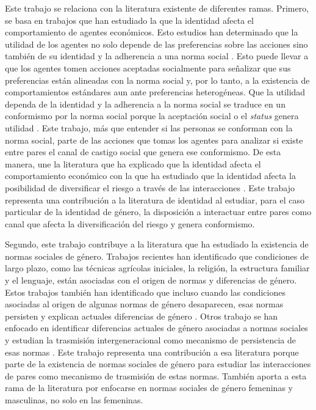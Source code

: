 Este trabajo se relaciona con la literatura existente de diferentes ramas. Primero, se basa en trabajos que han estudiado la que la identidad afecta el comportamiento de agentes económicos. Esto estudios han determinado  que la utilidad de los agentes no solo depende de las preferencias sobre las acciones sino también de su identidad y la adherencia a una norma social \citep{akerlof2000economics}. Esto puede llevar a que los agentes tomen acciones aceptadas socialmente para señalizar que sus preferencias están alineadas con la norma social y, por lo tanto, a la existencia de comportamientos estándares aun ante preferencias heterogéneas. Que la utilidad dependa de la identidad y la adherencia a la norma social se traduce en un conformismo por la norma social porque la aceptación social o el \textit{status} genera utilidad \citep{bernheim1994theory}. Este trabajo, más que entender si las personas se conforman con la norma social, parte de las acciones que tomas los agentes para analizar si existe entre pares el canal de castigo social que genera ese conformismo. De esta manera, une la literatura que ha explicado que la identidad afecta el comportamiento económico con la que ha estudiado que la identidad afecta la posibilidad de diversificar el riesgo a través de las interacciones \citep{fang2005dysfunctional}. Este trabajo representa una contribución a la literatura de identidad al estudiar, para el caso particular de la identidad de género,  la disposición a interactuar entre pares como canal que afecta la diversificación del riesgo y  genera conformismo.

Segundo, este trabajo contribuye a la literatura que ha estudiado la existencia de normas sociales de género. Trabajos recientes han identificado que condiciones de largo plazo, como las técnicas agrícolas iniciales, la religión, la estructura familiar y el lenguaje, están asociadas con el origen de normas y diferencias de género. Estos trabajos también han identificado que incluso cuando las condiciones asociadas al origen de algunas normas de género desaparecen, esas normas persisten y explican actuales diferencias de género \citep{giuliano2017gender}. Otros trabajo se han enfocado en identificar diferencias actuales de género asociadas a normas sociales \citep{lundborg2017childrencareer, bertrand2015genderandincome} y estudian la trasmisión intergeneracional como mecanismo de persistencia de esas normas \citep{nollenberger2016mathgap, kleven2018children}. Este trabajo representa una contribución a esa literatura porque parte de la existencia de normas sociales de género para estudiar las interacciones de pares como mecanismo de trasmisión de estas normas. También aporta a esta rama de la literatura por enfocarse en normas sociales de género femeninas y masculinas, no solo en las femeninas.


